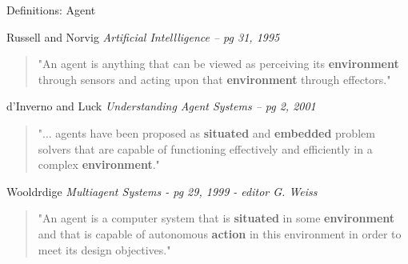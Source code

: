 \documentclass[aspectratio=1610,xcolor=dvipsnames,t]{beamer}
\begin{document}
\begin{frame}{Definitions: Agent} 
    \begin{block}{Russell and Norvig \emph{Artificial Intellligence -- pg 31, 1995}}
        \begin{quote}
            "An agent is anything that can be viewed as perceiving its 
            \textbf{environment} through sensors and acting upon that
            \textbf{environment} through effectors."
        \end{quote}
    \end{block} 

    \begin{block}{d'Inverno and Luck \emph{Understanding Agent Systems -- pg 2, 2001}}
        \begin{quote}
            "... agents have been proposed as \textbf{situated} and 
            \textbf{embedded} problem solvers that are capable of functioning
            effectively and efficiently in a complex \textbf{environment}."
         \end{quote} 
    \end{block} 

    \begin{block}{Wooldrdige \emph{Multiagent Systems - pg 29, 1999 - editor G. Weiss}}
        \begin{quote}
            "An agent is a computer system that is \textbf{situated} in some
            \textbf{environment} and that is capable of autonomous 
            \textbf{action} in this environment in order to meet its
            design objectives."
        \end{quote}
    \end{block} 

\end{frame} 
\end{document}
